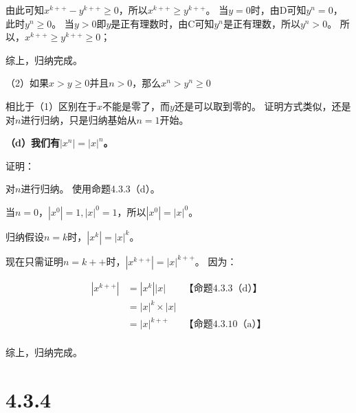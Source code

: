 \documentclass{article}
\theoremstyle{mystyle}
\begin{document}
由此可知$x^{k++} - y^{k++} \geq 0$，所以$x^{k++} \geq y^{k++}$。
当$y=0$时，由D可知$y^n = 0$，此时$y^n \geq 0$。
当$y>0$即$y$是正有理数时，由C可知$y^n$是正有理数，所以$y^n > 0$。
所以，$x^{k++} \geq y^{k++} \geq 0$；

综上，归纳完成。

（2）如果$x > y \geq 0$并且$n > 0$，那么$x^n > y^n \geq 0$

相比于（1）区别在于$x$不能是零了，而$y$还是可以取到零的。
证明方式类似，还是对$n$进行归纳，只是归纳基始从$n=1$开始。

\textbf{（d）我们有$|x^n|=|x|^n$。}

证明：

对$n$进行归纳。 使用命题4.3.3（d）。

当$n=0$，$|x^0| = 1, |x|^0 =1$，所以$|x^0| = |x|^0$。

归纳假设$n=k$时，$|x^k| = |x|^k$。

现在只需证明$n=k++$时，$|x^{k++}|=|x|^{k++}$。
因为：

\begin{align*}
  |x^{k++}| & = |x^k||x|         & \text{【命题4.3.3（d）】}  \\
            & = |x|^k \times |x|                        \\
            & = |x|^{k++}        & \text{【命题4.3.10（a）】} \\
\end{align*}

综上，归纳完成。

\section*{4.3.4}
\end{document}

